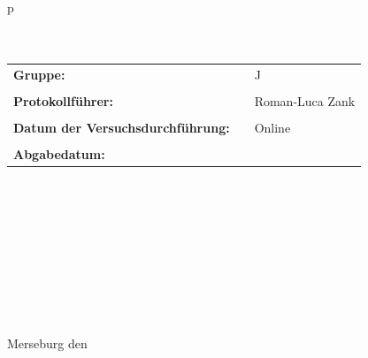\begin{center}
\begin{tabular}{p{\textwidth}}
\\ \\ \\

\begin{center}
\begin{tabular}{lll}
\large{\textbf{Gruppe:}} & & \large{J}\\
&&\\
\large{\textbf{Protokollführer:}} & & \large{Roman-Luca Zank}\\
&&\\
\large{\textbf{Datum der Versuchsdurchführung:}}&& \large{Online}\\
&&\\
\large{\textbf{Abgabedatum:}}&& \large{\todayDE}
\end{tabular}
\end{center}

\\ \\ \\ \\ \\ \\ \\ \\ \\
\large{Merseburg den \todayDE}

\end{tabular}
\end{center}
